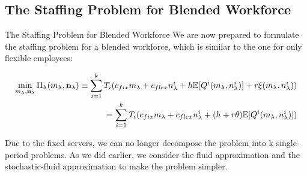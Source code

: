 \documentclass[8pt]{beamer}
\begin{document}
\subsection{The Staffing Problem for Blended Workforce}
\begin{frame}{The Staffing Problem for Blended Workforce}
We are now prepared to formulate the staffing problem for a blended workforce, which is similar to the one for only flexible employees:

\begin{equation}
\begin{aligned}
\min_{m_{\lambda},\bold{n}_{\lambda}} \Pi_{\lambda}(m_{\lambda},\bold{n}_{\lambda}) \equiv \sum_{i=1}^{k} T_i(c_{fix}m_{\lambda} + c_{flex}n_{\lambda}^i + h\mathbb{E}[Q^i(m_{\lambda},n_{\lambda}^i)] + r\xi(m_{\lambda},n_{\lambda}^i)) \\
= \sum_{i=1}^{k} T_i(c_{fix}m_{\lambda} + c_{flex}n_{\lambda}^i + (h+r\theta)\mathbb{E}[Q^i(m_{\lambda},n_{\lambda}^i)])
\end{aligned}
\end{equation}

Due to the fixed servers, we can no longer decompose the problem into k single-period problems.
As we did earlier, we consider the fluid approximation and the stochastic-fluid approximation to make the problem simpler. \\
\end{frame}
\end{document}
